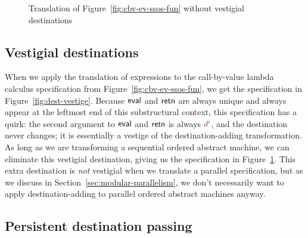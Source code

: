 \begin{figure}
\caption{Translation of Figure~\ref{fig:cbv-ev-ssos-fun} without vestigial destinations}
\label{fig:dest-cbv}
\end{figure}



\subsection{Vestigial destinations}
\label{sec:vestigial}

When we apply the translation of expressions to the call-by-value
lambda calculus specification from Figure~\ref{fig:cbv-ev-ssos-fun},
we get the specification in Figure~\ref{fig:dest-vestige}. Because
${\sf eval}$ and ${\sf retn}$ are always unique and always appear at
the leftmost end of this substructural context, this specification has
a quirk: the second argument to ${\sf eval}$ and ${\sf retn}$ is
always $\lf{d'}$, and the destination never changes; it is essentially
a vestige of the destination-adding transformation. As long as we are
transforming a sequential ordered abstract machine, we can eliminate
this vestigial destination, giving us the specification in
Figure~\ref{fig:dest-cbv}. This extra destination is {\it not}
vestigial when we translate a parallel specification, but as we
discuss in Section~\ref{sec:modular-parallelism}, we don't necessarily
want to apply destination-adding to parallel ordered abstract machines
anyway.

\subsection{Persistent destination passing}
\label{sec:persistentdestpass}

